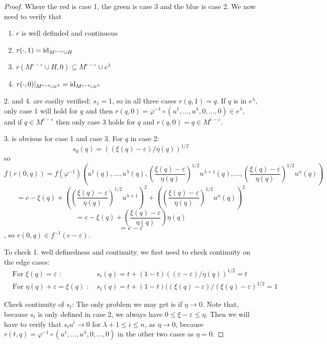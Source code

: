 \begin{proof}
   Where the red is case 1, the green is case 3 and the blue is case 2.
   We now need to verify that
   \begin{enumerate}
      \item $r$ is well definded and continuous 
      \item $r(\cdot, 1) = { \operatorname{id} }_{M^{c - \varepsilon} \cup H}$
      \item $r(M^{c - \varepsilon} \cup H, 0) 
         \subseteq M^{c - \varepsilon} \cup e^{\lambda}$
      \item $r(\cdot, 0)|_{M^{c - \varepsilon} \cup e^{\lambda}} 
         = { \operatorname{id} }_{M^{c - \varepsilon} \cup e^{\lambda}}$
   \end{enumerate}

   2. and 4. are easiliy verified:
   $s_1 = 1$, so in all three cases $r(q, 1) = q$. If $q$ is in $e^{\lambda}$,
   only case 1 will hold for $q$ and then 
   $r(q, 0) = \varphi^{-1} \circ (u^1, ..., u^{\lambda}, 0, ..., 0) \in e^{\lambda}$,
   and if $q \in M^{c - \varepsilon}$ then only case 3 holds for $q$ and 
   $r(q, 0) = q \in M^{c - \varepsilon}$.

   3. is obvious for case 1 and case 3. For $q$ in case 2:
   \[ s_0(q) = ((\xi(q) - \varepsilon)/\eta(q))^{1/2} \]
   so
   \[
      f(r(0, q)) = 
         f(\varphi^{-1})(u^1(q), ... , u^{\lambda}(q), 
            \left( \frac{\xi(q) - \varepsilon}{\eta(q)} \right)^{1/2} u^{\lambda + 1}(q), ... , 
            \left( \frac{\xi(q) - \varepsilon}{\eta(q)} \right)^{1/2} u^n(q)) 
   \]
   \[
      = c - \xi(q) + \left( \left( \frac{\xi(q) - \varepsilon}{\eta(q)} \right)^{1/2} u^{\lambda + 1} \right)^2
         + \left( \left( \frac{\xi(q) - \varepsilon}{\eta(q)} \right)^{1/2} u^n(q) \right)^2
   \]
   \[ = c - \xi(q) + \left( \frac{\xi(q) - \varepsilon}{\eta(q)} \right)\eta(q) \]
   \[ = c - \varepsilon \]
   , so $r(0, q) \in f^{-1}(c - \varepsilon)$.

   To check 1. well definedness and continuity, we first need to check 
   continuity on the edge cases: 
   \begin{align*}
      & \text{For } \xi(q) = \varepsilon \text{ : } 
         & s_t(q) = t + (1 - t)((\varepsilon - \varepsilon)/\eta(q))^{1/2} = t \\
      & \text{For } \eta(q) + \varepsilon = \xi(q) \text{ : }
         & s_t(q) = t + (1 - t)((\xi(q) - \varepsilon)/(\xi(q) - \varepsilon)^{1/2} 
         = 1
   \end{align*}

   Check continuity of $s_t$:
   The only problem we may get is if $\eta \rightarrow 0$. Note that, because 
   $s_t$ is only defined in case 2, we always have $0 \leq \xi - \varepsilon \leq \eta$. 
   Then we will have to verify that $s_tu^i \rightarrow 0$ for $\lambda + 1 \leq i \leq n$,
   as $\eta \rightarrow 0$, because 
   $r(t, q) = \varphi^{-1} \circ (u^1, ..., u^{\lambda}, 0, ..., 0)$ in the other
   two cases as $\eta = 0$.


\end{proof}
